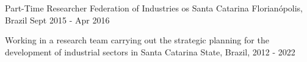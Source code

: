 \begin{cventries}
\cventry
    {Part-Time Researcher}
    {Federation of Industries os Santa Catarina}
    {Florianópolis, Brazil}
    {Sept 2015 - Apr 2016}
    {
        \begin{cvitems}
            \item {Working in a research team carrying out the strategic planning for the development of industrial sectors in Santa Catarina State, Brazil, 2012 - 2022}
        \end{cvitems}
    }

\end{cventries}
